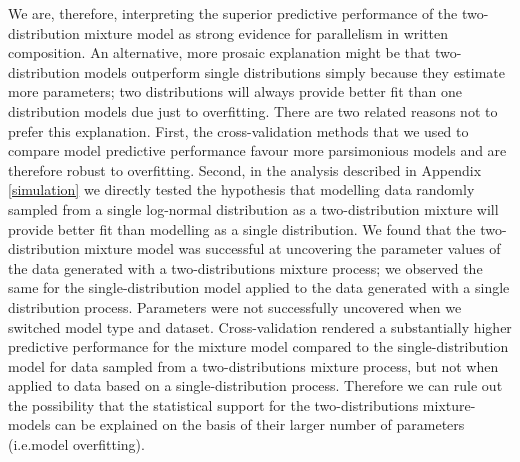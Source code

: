 \documentclass[
  man,floatsintext]{apa7}
\begin{document}
We are, therefore, interpreting the superior predictive performance of the two-distribution mixture model as strong evidence for parallelism in written composition. An alternative, more prosaic explanation might be that two-distribution models outperform single distributions simply because they estimate more parameters; two distributions will always provide better fit than one distribution models due just to overfitting. There are two related reasons not to prefer this explanation. First, the cross-validation methods that we used to compare model predictive performance favour more parsimonious models and are therefore robust to overfitting. Second, in the analysis described in Appendix \ref{simulation} we directly tested the hypothesis that modelling data randomly sampled from a single log-normal distribution as a two-distribution mixture will provide better fit than modelling as a single distribution. We found that the two-distribution mixture model was successful at uncovering the parameter values of the data generated with a two-distributions mixture process; we observed the same for the single-distribution model applied to the data generated with a single distribution process. Parameters were not successfully uncovered when we switched model type and dataset. Cross-validation rendered a substantially higher predictive performance for the mixture model compared to the single-distribution model for data sampled from a two-distributions mixture process, but not when applied to data based on a single-distribution process. Therefore we can rule out the possibility that the statistical support for the two-distributions mixture-models can be explained on the basis of their larger number of parameters (i.e.model overfitting).
\end{document}
